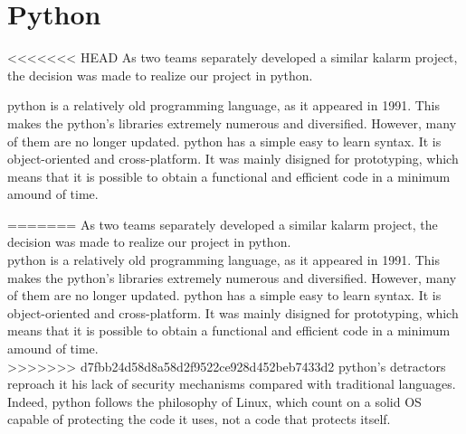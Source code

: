 \section{Python}
<<<<<<< HEAD
As two teams separately developed a similar \gls{kalarm} project, the decision was made to realize our project in python.

\gls{python} is a relatively old programming language, as it appeared in 1991. This makes the \gls{python}'s libraries extremely numerous and diversified. However, many of them are no longer updated. \gls{python} has a simple easy to learn syntax. It is object-oriented and cross-platform. It was mainly disigned for prototyping, which means that it is possible to obtain a functional and efficient code in a minimum amound of time.

=======
As two teams separately developed a similar \gls{kalarm} project, the decision was made to realize our project in python.\\
\gls{python} is a relatively old programming language, as it appeared in 1991. This makes the \gls{python}'s libraries extremely numerous and diversified. However, many of them are no longer updated. \gls{python} has a simple easy to learn syntax. It is object-oriented and cross-platform. It was mainly disigned for prototyping, which means that it is possible to obtain a functional and efficient code in a minimum amound of time.\\
>>>>>>> d7fbb24d58d8a58d2f9522ce928d452beb7433d2
\gls{python}'s detractors reproach it his lack of security mechanisms compared with traditional languages. Indeed, \gls{python} follows the philosophy of Linux, which count on a solid OS capable of protecting the code it uses, not a code that protects itself.
